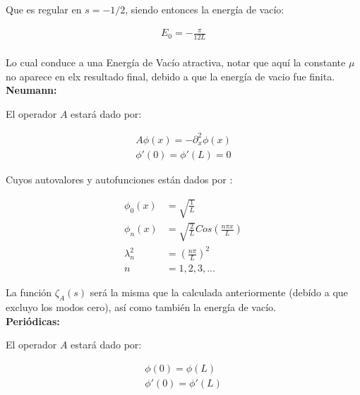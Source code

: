 Que es regular en $s=-1/2$, siendo entonces la energía de vacío:

\begin{equation}
\begin{array}{c}
E _0 = - \frac{\pi}{12 L} \\[8pt]
\end{array}
\end{equation}

Lo cual conduce a una Energía de Vacío atractiva, notar que aquí la constante $\mu$ no aparece en elx resultado final, debido a que la energía de vacio fue finita.\\

\textbf{Neumann:}

El operador $A$ estará dado por:

\begin{equation}
\begin{array}{c}
	A \phi (x) = - \partial _x ^2 \phi (x) \\[10pt]
    \phi ' (0) = \phi ' (L) = 0 
\end{array}
\end{equation}



Cuyos autovalores y autofunciones están dados por  : 

\begin{equation}
\begin{aligned}
	\phi _0 (x) &= \sqrt{ \frac{1}{L} } \\[5pt]
	\phi _n (x)  &= \sqrt{\frac{2}{L}} Cos( \frac{n \pi x}{L} ) \\[5pt]
	\lambda _n ^2 &= \left( \frac{n \pi }{L} \right) ^2 \\[5pt]
	n &= 1,2,3, ...
\end{aligned}
\end{equation}



La función $\zeta _A (s)$ será la misma que la calculada anteriormente (debído a que excluyo los modos cero), así como también la energía de vacío. \\

\textbf{Periódicas:}

El operador $A$ estará dado por:

\begin{equation}
\begin{array}{c}
    \phi (0) = \phi (L)  \\[5pt]
    \phi ' (0) = \phi ' (L)
\end{array}
\end{equation}

